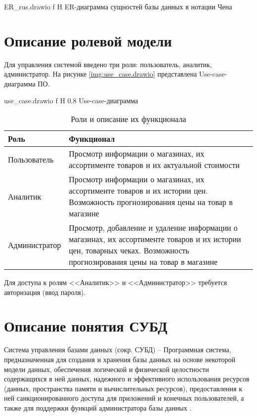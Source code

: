 \documentclass{bmstu}
\begin{document}
	{ER_rus.drawio}
	{f}
	{H}
	{\textwidth}
	{ER-диаграмма сущностей базы данных в нотации Чена}

\section{Описание ролевой модели}

Для управления системой введено три роли: пользователь, аналитик, администратор. На рисунке \ref{img:use_case.drawio} представлена Use-case-диаграмма ПО.

	{use_case.drawio}
	{f}
	{H}
	{0.8\textwidth}
	{Use-case-диаграмма}


\begin{table}[H]
	\caption{Роли и описание их функционала}
	\begin{center}
		\begin{tabular}{| l | p{12 cm} |} 
			\hline
			
			\textbf{Роль} & \textbf{Функционал} \\  
			
			\hline
			
			Пользователь & Просмотр информации о магазинах, их ассортименте товаров и их актуальной стоимости \\
			
			\hline
			
			Аналитик & Просмотр информации о магазинах, их ассортименте товаров и их истории цен. Возможность прогнозирования цены на товар в магазине \\
			
			\hline
			
			Администратор & Просмотр, добавление и удаление информации о магазинах, их ассортименте товаров и их истории цен, товарных чеках. Возможность прогнозирования цены на товар в магазине \\
			
			\hline
		\end{tabular}
	\end{center}
\end{table}



Для доступа к ролям <<Аналитик>> и <<Администратор>> требуется авторизация (ввод пароля).

\section{Описание понятия СУБД}

Система управления базами данных (сокр. СУБД) -- Программная система, предназначенная для создания и хранения базы данных на основе некоторой модели данных, обеспечения логической и физической целостности содержащихся в ней данных, надежного и эффективного использования ресурсов (данных, пространства памяти и вычислительных ресурсов), предоставления к ней санкционированного доступа для приложений и конечных пользователей, а также для поддержки 
функций администратора базы данных \cite{kogal}.
\end{document}
